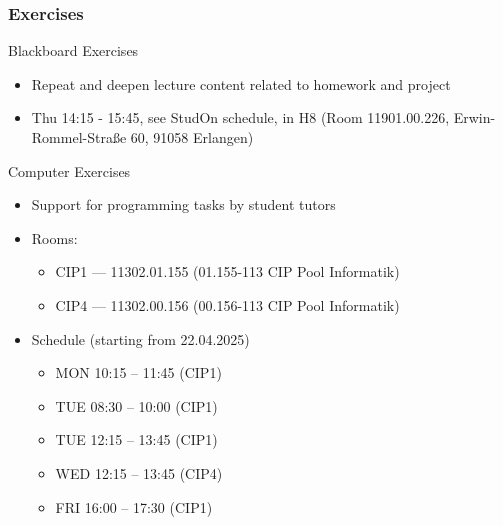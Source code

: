 \begin{frame}
	\frametitle{Exercises}
	\begin{block}{Blackboard Exercises}
		\begin{itemize}
			\item Repeat and deepen lecture content related to homework and project
			\item Thu 14:15 - 15:45, see StudOn schedule, in H8 (Room 11901.00.226, Erwin-Rommel-Straße 60, 91058 Erlangen)
		\end{itemize}
	\end{block}
	\begin{block}{Computer Exercises}
\begin{itemize}
    \item Support for programming tasks by student tutors
    \item Rooms:
    \begin{itemize}
        \item CIP1 — 11302.01.155 (01.155-113 CIP Pool Informatik)
        \item CIP4 — 11302.00.156 (00.156-113 CIP Pool Informatik)
    \end{itemize}
    \item Schedule (starting from 22.04.2025)
    \begin{itemize}
        \item MON 10:15 -- 11:45 (CIP1)
        \item TUE 08:30 -- 10:00 (CIP1)
        \item TUE 12:15 -- 13:45 (CIP1)
        \item WED 12:15 -- 13:45 (CIP4)
        \item FRI 16:00 -- 17:30 (CIP1)
    \end{itemize}
\end{itemize}
	\end{block}
\end{frame}

